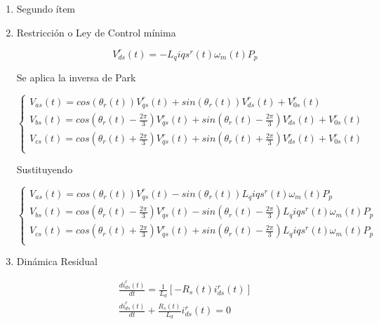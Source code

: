 \documentclass{article}
\begin{document}
\begin{enumerate}[label=\roman*.]
    \item Segundo ítem
    
    
    
    \item Restricción o Ley de Control mínima

    \begin{equation}
        V_{ds}^r(t) = -L_{q}i{qs}^r(t)\omega_{m}(t)P_{p}
    \end{equation}

    Se aplica la inversa de Park

    \begin{equation}
        \begin{cases}
            V_{as}(t) = cos(\theta_{r}(t))V_{qs}^r(t) + sin(\theta_{r}(t))V_{ds}^r(t) + V_{0s}^r(t)\\
            V_{bs}(t) = cos(\theta_{r}(t) - \frac{2\pi}{3})V_{qs}^r(t) + sin(\theta_{r}(t) - \frac{2\pi}{3})V_{ds}^r(t) + V_{0s}^r(t)\\
            V_{cs}(t) = cos(\theta_{r}(t) + \frac{2\pi}{3})V_{qs}^r(t) + sin(\theta_{r}(t) + \frac{2\pi}{3})V_{ds}^r(t) + V_{0s}^r(t)\\
        \end{cases}
    \end{equation}

    Sustituyendo

    \begin{equation}
        \begin{cases}
            V_{as}(t) = cos(\theta_{r}(t))V_{qs}^r(t) - sin(\theta_{r}(t))L_{q}i{qs}^r(t)\omega_{m}(t)P_{p}\\
            V_{bs}(t) = cos(\theta_{r}(t) - \frac{2\pi}{3})V_{qs}^r(t) - sin(\theta_{r}(t) - \frac{2\pi}{3})L_{q}i{qs}^r(t)\omega_{m}(t)P_{p}\\
            V_{cs}(t) = cos(\theta_{r}(t) + \frac{2\pi}{3})V_{qs}^r(t) + sin(\theta_{r}(t) - \frac{2\pi}{3})L_{q}i{qs}^r(t)\omega_{m}(t)P_{p}\\
        \end{cases}
    \end{equation}

    \item Dinámica Residual
    
    \begin{equation}
        \begin{aligned}
        \frac{di_{ds}^r(t)}{dt} = \frac{1}{L_{d}}[-R_{s}(t)i_{ds}^r(t)] \\
        \frac{di_{ds}^r(t)}{dt} + \frac{R_{s}(t)}{L_{d}}i_{ds}^r(t) = 0 \\
        \end{aligned}
    \end{equation} 


\end{enumerate}
\end{document}

